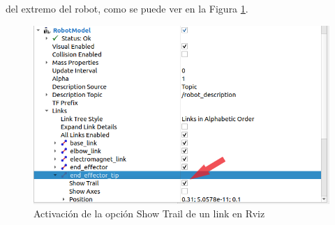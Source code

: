del extremo del robot, como se puede ver en la Figura \ref{fig:activarTrail}.
\begin{figure} [ht!]
    \begin{center}
        \includegraphics[width=12cm]{figs/rviz_show_trail.png}
    \end{center}
    \caption{Activación de la opción Show Trail de un link en Rviz}
\label{fig:activarTrail}
\end{figure}



